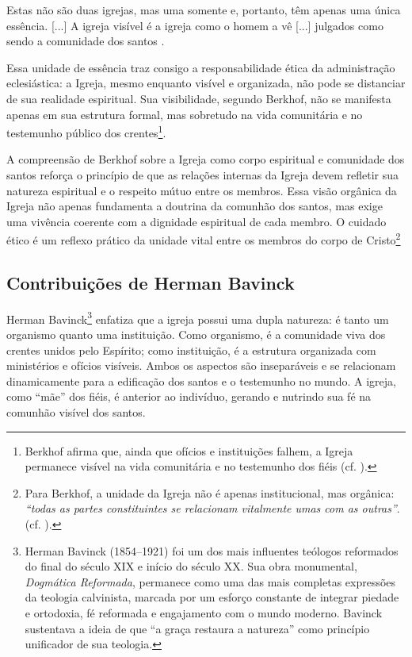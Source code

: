 \begin{citacao}
    Estas não são duas igrejas, mas uma somente e, portanto, têm apenas uma única essência. [...] A igreja visível é a igreja como o homem a vê [...] julgados como sendo a comunidade dos santos \cite[p.~642]{berkhof2012}.
\end{citacao}

Essa unidade de essência traz consigo a responsabilidade ética da administração eclesiástica: a Igreja, mesmo enquanto visível e organizada, não pode se distanciar de sua realidade espiritual. Sua visibilidade, segundo Berkhof, não se manifesta apenas em sua estrutura formal, mas sobretudo na vida comunitária e no testemunho público dos crentes\footnote{Berkhof afirma que, ainda que ofícios e instituições falhem, a Igreja permanece visível na vida comunitária e no testemunho dos fiéis (cf. \cite[p.~645]{berkhof2012}).}.

A compreensão de Berkhof sobre a Igreja como corpo espiritual e comunidade dos santos reforça o princípio de que as relações internas da Igreja devem refletir sua natureza espiritual e o respeito mútuo entre os membros. Essa visão orgânica da Igreja não apenas fundamenta a doutrina da comunhão dos santos, mas exige uma vivência coerente com a dignidade espiritual de cada membro. O cuidado ético é um reflexo prático da unidade vital entre os membros do corpo de Cristo\footnote{Para Berkhof, a unidade da Igreja não é apenas institucional, mas orgânica: \textit{``todas as partes constituintes se relacionam vitalmente umas com as outras''}. (cf. \cite[p.~646]{berkhof2012}).}

\subsection{Contribuições de Herman Bavinck}

Herman Bavinck\footnote{Herman Bavinck (1854–1921) foi um dos mais influentes teólogos reformados do final do século XIX e início do século XX. Sua obra monumental, \textit{Dogmática Reformada}, permanece como uma das mais completas expressões da teologia calvinista, marcada por um esforço constante de integrar piedade e ortodoxia, fé reformada e engajamento com o mundo moderno. Bavinck sustentava a ideia de que ``a graça restaura a natureza'' como princípio unificador de sua teologia.} enfatiza que a igreja possui uma dupla natureza: é tanto um organismo quanto uma instituição. Como organismo, é a comunidade viva dos crentes unidos pelo Espírito; como instituição, é a estrutura organizada com ministérios e ofícios visíveis. Ambos os aspectos são inseparáveis e se relacionam dinamicamente para a edificação dos santos e o testemunho no mundo. A igreja, como ``mãe'' dos fiéis, é anterior ao indivíduo, gerando e nutrindo sua fé na comunhão visível dos santos. \cite{bavinck2012}

